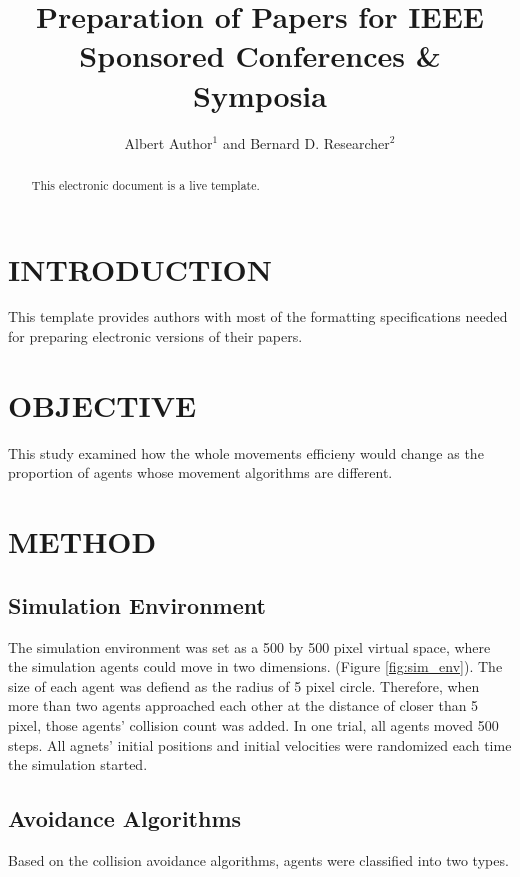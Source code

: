 \documentclass[letterpaper, 10 pt, conference]{ieeeconf}  %
\title{\LARGE \bf
Preparation of Papers for IEEE Sponsored Conferences \& Symposia
}
\author{Albert Author$^{1}$ and Bernard D. Researcher$^{2}$}
\begin{document}
\maketitle
\thispagestyle{empty}
\pagestyle{empty}


\begin{abstract}

This electronic document is a live template. 

\end{abstract}

\section{INTRODUCTION}
This template provides authors with most of the formatting specifications needed for preparing electronic versions of their papers. 

\section{OBJECTIVE}
This study examined how the whole movements efficieny would change as the proportion of agents whose movement algorithms are different.

\section{METHOD}

\subsection{Simulation Environment}
The simulation environment was set as a 500 by 500 pixel virtual space, where the simulation agents could move in two dimensions. (Figure \ref{fig:sim_env}). The size of each agent was defiend as the radius of 5 pixel circle. Therefore, when more than two agents approached each other at the distance of closer than 5 pixel, those agents' collision count was added. In one trial, all agents moved 500 steps. All agnets' initial positions and initial velocities were randomized each time the simulation started.

\subsection{Avoidance Algorithms}
Based on the collision avoidance algorithms, agents were classified into two types.
\end{document}
